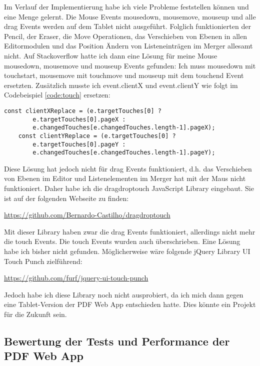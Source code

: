Im Verlauf der Implementierung habe ich viele Probleme feststellen können und eine Menge gelernt. Die Mouse Events mousedown, mousemove, mouseup und alle drag Events werden auf dem Tablet nicht ausgeführt. Folglich funktionierten der Pencil, der Eraser, die Move Operationen, das Verschieben von Ebenen in allen Editormodulen und das Position Ändern von Listeneinträgen im Merger allesamt nicht. Auf Stackoverflow hatte ich dann eine Lösung für meine Mouse mousedown, mousemove und mouseup Events gefunden: Ich muss mousedown mit touchstart, mousemove mit touchmove und mouseup mit dem touchend Event ersetzten. Zusätzlich musste ich event.clientX und event.clientY wie folgt im Codebeispiel \ref{code:touch} ersetzen:

\begin{lstlisting}[style=ES6, caption={e.clientX und e.clientY Ersetzung}, label=code:touch]
	const clientXReplace = (e.targetTouches[0] ? 
		e.targetTouches[0].pageX : 
		e.changedTouches[e.changedTouches.length-1].pageX);
	const clientYReplace = (e.targetTouches[0] ? 
		e.targetTouches[0].pageY : 
		e.changedTouches[e.changedTouches.length-1].pageY);
\end{lstlisting} 

Diese Lösung hat jedoch nicht für drag Events funktioniert, d.h. das Verschieben von Ebenen im Editor und Listenelementen im Merger hat mit der Maus nicht funktioniert. Daher habe ich die dragdroptouch JavaScript Library eingebaut. Sie ist auf der folgenden Webseite zu finden:

\url{https://github.com/Bernardo-Castilho/dragdroptouch}

Mit dieser Library haben zwar die drag Events funktioniert, allerdings nicht mehr die touch Events. Die touch Events wurden auch überschrieben. Eine Lösung habe ich bisher nicht gefunden. Möglicherweise wäre folgende jQuery Library UI Touch Punch zielführend:

\url{https://github.com/furf/jquery-ui-touch-punch}

Jedoch habe ich diese Library noch nicht ausprobiert, da ich mich dann gegen eine Tablet-Version der PDF Web App entschieden hatte. Dies könnte ein Projekt für die Zukunft sein.


\subsection{Bewertung der Tests und Performance der PDF Web App}


